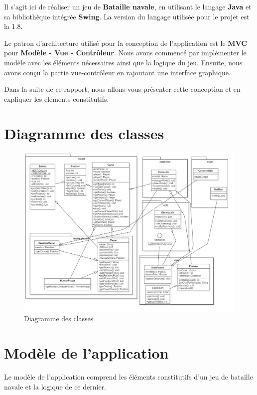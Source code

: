 \documentclass[a4paper, 12pt]{report}
\begin{document}
    Il s'agit ici de réaliser un jeu de \textbf{Bataille navale}, en utilisant le langage \textbf{Java} et sa
    bibliothèque intégrée \textbf{Swing}. La version du langage utilisée pour le projet est la 1.8.

    Le patron d'architecture utilisé pour la conception de l'application est le \textbf{MVC} pour \textbf{Modèle - Vue -
    Contrôleur}. Nous avons commencé par implémenter le modèle avec les éléments nécessaires ainsi que la logique du jeu.
    Ensuite, nous avons conçu la partie vue-contrôleur en rajoutant une interface graphique.

    Dans la suite de ce rapport, nous allons vous présenter cette conception et en expliquer les éléments constitutifs.

    \chapter{Diagramme des classes}
    \begin{figure}[h!]
        \centering
        \includegraphics[scale=0.4]{images/diagrammeClasse.png}
        \caption{Diagramme des classes}
        \label{fig:diagramme_classes_illustration}
    \end{figure}


    \chapter{Modèle de l'application}
    Le modèle de l'application comprend les éléments constitutifs d'un jeu de bataille navale et la logique de ce dernier.
\end{document}
